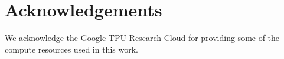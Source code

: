 \section*{Acknowledgements}

We acknowledge the Google TPU Research Cloud for providing some of the compute resources used in this work.
